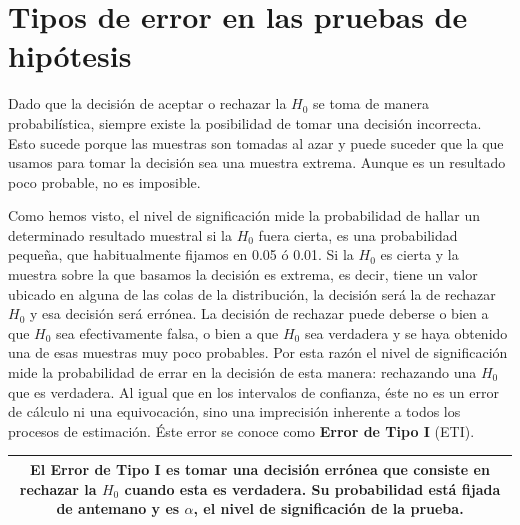 \documentclass[]{book}
\begin{document}
\hypertarget{tipos-de-error-en-las-pruebas-de-hipuxf3tesis}{%
\section{Tipos de error en las pruebas de hipótesis}\label{tipos-de-error-en-las-pruebas-de-hipuxf3tesis}}

Dado que la decisión de aceptar o rechazar la \(H_{0}\) se toma de manera
probabilística, siempre existe la posibilidad de tomar una decisión
incorrecta. Esto sucede porque las muestras son tomadas al azar y puede
suceder que la que usamos para tomar la decisión sea una muestra
extrema. Aunque es un resultado poco probable, no es imposible.

Como hemos visto, el nivel de significación mide la probabilidad de
hallar un determinado resultado muestral si la \(H_{0}\) fuera cierta, es una
probabilidad pequeña, que habitualmente fijamos en 0.05 ó 0.01. Si la
\(H_{0}\) es cierta y la muestra sobre la que basamos la decisión es extrema,
es decir, tiene un valor ubicado en alguna de las colas de la
distribución, la decisión será la de rechazar \(H_{0}\) y esa decisión será
errónea. La decisión de rechazar puede deberse o bien a que \(H_{0}\) sea
efectivamente falsa, o bien a que \(H_{0}\) sea verdadera y se haya obtenido
una de esas muestras muy poco probables. Por esta razón el nivel de
significación mide la probabilidad de errar en la decisión de esta
manera: rechazando una \(H_{0}\) que es verdadera. Al igual que en los
intervalos de confianza, éste no es un error de cálculo ni una
equivocación, sino una imprecisión inherente a todos los procesos de
estimación. Éste error se conoce como \textbf{Error de Tipo I} (ETI).

\begin{longtable}[]{@{}c@{}}
\toprule
\endhead
\begin{minipage}[t]{0.97\columnwidth}\centering
El \textbf{Error de Tipo I} es tomar una decisión errónea que consiste en rechazar la \(H_{0}\) cuando esta es verdadera. Su probabilidad está fijada de antemano y es \(\alpha\), el nivel de significación de la prueba.\strut
\end{minipage}\tabularnewline
\bottomrule
\end{longtable}
\end{document}
